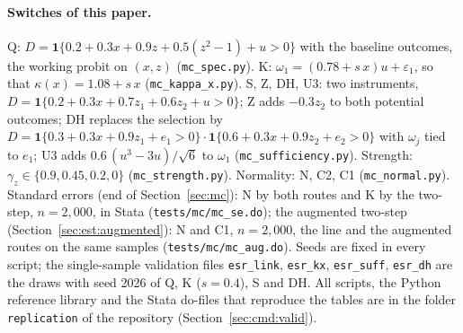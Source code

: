 \documentclass[11pt,a4paper]{article}
\theoremstyle{plain}
\theoremstyle{definition}
\theoremstyle{remark}
\newcommand{\1}{\mathbf{1}}
\newcommand{\cmd}[1]{\texttt{#1}}
\newcommand{\kX}{\kappa(x)}
\begin{document}
\paragraph{Switches of this paper.}
Q: $D=\1\{0.2+0.3x+0.9z+0.5(z^2-1)+u>0\}$ with the baseline outcomes, the
working probit on $(x,z)$ (\cmd{mc\_spec.py}).
K: $\omega_1=(0.78+s\,x)u+\varepsilon_1$, so that $\kX=1.08+s\,x$
(\cmd{mc\_kappa\_x.py}). S, Z, DH, U3: two instruments,
$D=\1\{0.2+0.3x+0.7z_1+0.6z_2+u>0\}$; Z adds $-0.3z_2$ to both potential
outcomes; DH replaces the selection by
$D=\1\{0.3+0.3x+0.9z_1+e_1>0\}\cdot\1\{0.6+0.3x+0.9z_2+e_2>0\}$ with
$\omega_j$ tied to $e_1$; U3 adds $0.6\,(u^3-3u)/\sqrt6$ to $\omega_1$
(\cmd{mc\_sufficiency.py}). Strength: $\gamma_z\in\{0.9,0.45,0.2,0\}$
(\cmd{mc\_strength.py}). Normality: N, C2, C1 (\cmd{mc\_normal.py}).
Standard errors (end of Section~\ref{sec:mc}): N by both routes and K by
the two-step, $n=2{,}000$, in Stata (\cmd{tests/mc/mc\_se.do}); the
augmented two-step (Section~\ref{sec:est:augmented}): N and C1,
$n=2{,}000$, the line and the augmented routes on the same samples
(\cmd{tests/mc/mc\_aug.do}). Seeds are fixed in every script; the single-sample validation files \cmd{esr\_link}, \cmd{esr\_kx},
\cmd{esr\_suff}, \cmd{esr\_dh} are the draws with seed 2026 of Q, K
($s=0.4$), S and DH.
All scripts, the Python reference library and the Stata do-files that
reproduce the tables are in the folder \cmd{replication} of the
repository (Section~\ref{sec:cmd:valid}).
\end{document}
